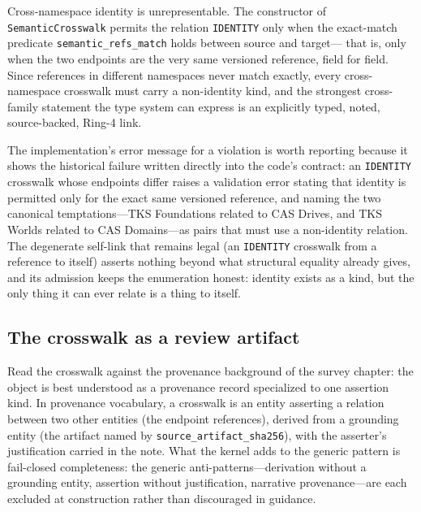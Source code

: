 \begin{ruleenv}\label{ch03:rule-noid}
Cross-namespace identity is unrepresentable. The constructor of
\texttt{SemanticCrosswalk} permits the relation
\texttt{IDENTITY} only when the exact-match predicate
\texttt{semantic\_refs\_match} holds between source and target---
that is, only when the two endpoints are the very same versioned
reference, field for field. Since references in different
namespaces never match exactly, every cross-namespace crosswalk
must carry a non-identity kind, and the strongest cross-family
statement the type system can express is an explicitly typed,
noted, source-backed, Ring-4 link.
\end{ruleenv}

The implementation's error message for a violation is worth
reporting because it shows the historical failure written directly
into the code's contract: an \texttt{IDENTITY} crosswalk whose
endpoints differ raises a validation error stating that identity
is permitted only for the exact same versioned reference, and
naming the two canonical temptations---TKS Foundations related to
CAS Drives, and TKS Worlds related to CAS Domains---as pairs that
must use a non-identity relation. The degenerate self-link that
remains legal (an \texttt{IDENTITY} crosswalk from a reference to
itself) asserts nothing beyond what structural equality already
gives, and its admission keeps the enumeration honest: identity
exists as a kind, but the only thing it can ever relate is a
thing to itself.

\subsection{The crosswalk as a review artifact}\label{ch03:xw-review}

Read the crosswalk against the provenance
background of the survey chapter: the object is best
understood as a provenance record specialized to one assertion
kind. In provenance vocabulary, a crosswalk is an entity asserting
a relation between two other entities (the endpoint references),
derived from a grounding entity (the artifact named by
\texttt{source\_artifact\_sha256}), with the asserter's
justification carried in the note. What the kernel adds to the
generic pattern is fail-closed completeness: the generic
anti-patterns---derivation without a grounding entity, assertion
without justification, narrative provenance---are each excluded at
construction rather than discouraged in guidance.

